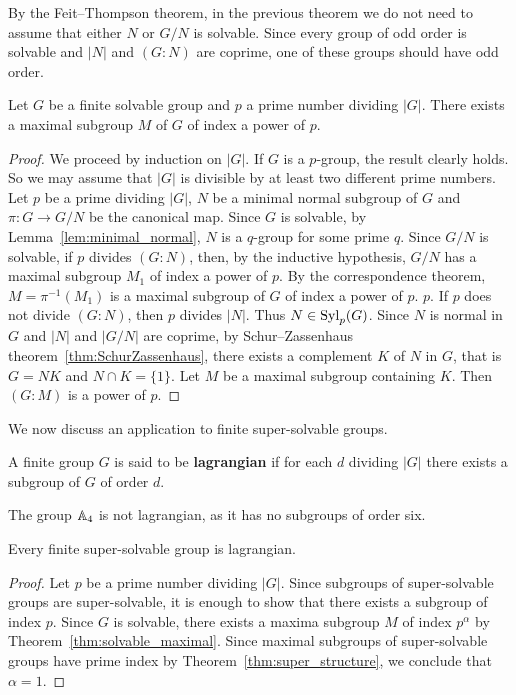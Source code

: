 By the Feit--Thompson theorem, in the previous theorem 
we do not need to assume that either $N$ or $G/N$ is solvable. Since every group of odd order is solvable 
and $|N|$ and $(G:N)$ are coprime, one of these groups should have odd order. 

\begin{theorem}
	\label{thm:solvable_maximal}
	Let $G$ be a finite solvable group and $p$ a prime number dividing $|G|$. There exists a maximal 
    subgroup $M$ of $G$ of index a power of $p$. 
\end{theorem}

\begin{proof}
	We proceed by induction on $|G|$. If $G$ is a $p$-group, the result clearly holds. So we may assume that $|G|$ is divisible by at least two different prime numbers. 
    Let $p$ be a prime dividing $|G|$, $N$ be a minimal normal subgroup of $G$ and 
    $\pi\colon G\to G/N$ be the canonical map. Since $G$ is solvable, by Lemma~\ref{lem:minimal_normal}, 
    $N$ is a $q$-group for some prime $q$. Since $G/N$ is solvable, if $p$ divides 
	$(G:N)$, then, by the inductive hypothesis, $G/N$ has a maximal subgroup 
 	$M_1$ of index a power of $p$. By the correspondence theorem, 
  $M=\pi^{-1}(M_1)$ is a maximal subgroup of $G$ of index a power of $p$. 
  $p$. If $p$ does not divide $(G:N)$, then $p$ divides $|N|$. Thus 
	$N\in\mathrm{Syl}_p(G)$. Since $N$ is normal in $G$ and $|N|$ and $|G/N|$ are coprime, by 
	Schur--Zassenhaus theorem~\ref{thm:SchurZassenhaus}, 
	there exists a complement $K$ of $N$ in $G$, that is $G=NK$ and $N\cap K=\{1\}$. Let 
	$M$ be a maximal subgroup containing $K$. Then $(G:M)$ is a power of $p$. 
\end{proof}

We now discuss an application to finite super-solvable groups. 

\begin{definition}
	A finite group $G$ is said to be \textbf{lagrangian} if for each $d$ dividing $|G|$ 
	there exists a subgroup of $G$ of order $d$.
\end{definition}

The group $\mathbb{A}_4$ is not lagrangian, as it has no subgroups of order six. 

\begin{theorem}
	Every finite super-solvable group is lagrangian. 
\end{theorem}

\begin{proof}
	Let $p$ be a prime number dividing $|G|$. Since subgroups of super-solvable groups are super-solvable, it is enough to 
    show that there exists a subgroup of index $p$. 
	Since $G$ is solvable, there exists a maxima subgroup $M$ of index 
	$p^{\alpha}$ by Theorem~\ref{thm:solvable_maximal}. Since maximal subgroups of super-solvable groups have prime index 
    by Theorem~\ref{thm:super_structure}, we conclude that $\alpha=1$.
\end{proof}

